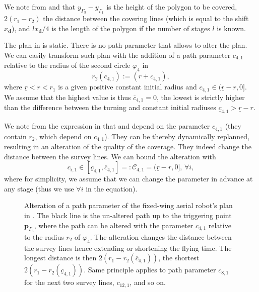 We note from  and  that $y_{\Gamma_3}-y_{\Gamma_1}$ is the height of the polygon to be covered, $2(r_1-r_2)$ the distance between the covering lines (which is equal to the shift $x_\mathbf{d}$), and $lx_\mathbf{d}/4$ is the length of the polygon if the number of stages $l$ is known.

The plan in  is static. There is no path parameter that allows to alter the plan. We can easily transform such plan with the addition of a path parameter $c_{4,1}$ relative to the radius of the second circle $\varphi_4$ in 
\begin{equation}\label{eq:radius-dynamic}
  r_2(c_{4,1}):=(r+c_{4,1}),
\end{equation}
where $\underline{r}<r<r_1$ is a given positive constant initial radius and $c_{4,1}\in(\underline{r}-r,0]$. We assume that the highest value is thus $\overline{c}_{4,1}=0$, the lowest is strictly higher than the difference between the turning and constant initial radiuses $\underline{c}_{4,1}>\underline{r}-r$.

We note from the expression in  that  and  depend on the parameter $c_{4,1}$ (they contain $r_2$, which depend on $c_{4,1}$). They can be thereby dynamically replanned, resulting in an alteration of the quality of the coverage. They indeed change the distance between the survey lines.
We can bound the alteration with 
\begin{equation}\label{eq:path-const-c}
  c_{i,1}\in[\underline{c}_{4,1},\overline{c}_{4,1}]=:\mathcal{C}_{4,1}=(\underline{r}-r,0],\,\forall i,
\end{equation} 
where for simplicity, we assume that we can change the parameter in advance at any stage (thus we use $\forall i$ in the equation).

\begin{sidewaysfigure}
  \rotatesidewayslabel
  \centering
  
  \vspace*{42pt}
  \caption[Alteration of a path parameter of the fixed-wing aerial robot's plan]{Alteration of a path parameter of the fixed-wing aerial robot's plan in . The black line is the un-altered path up to the triggering point $\mathbf{p}_{\Gamma_3}$, where the path can be altered with the parameter $c_{4,1}$ relative to the radius $r_2$ of $\varphi_4$. The alteration changes the distance between the survey lines hence extending or shortening the flying time. The longest distance is then $2(r_1-r_2(\overline{c}_{4,1}))$, the shortest $2(r_1-r_2(\underline{c}_{4,1}))$. Same principle applies to path parameter $c_{8,1}$ for the next two survey lines, $c_{12,1}$, and so on.}
  \label{fig:zambo-repla_pb}
\end{sidewaysfigure}

